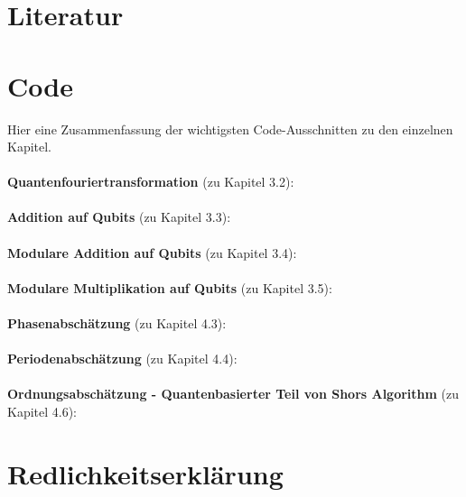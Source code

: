 \section{Literatur}
\printbibliography[heading=none]
\pagebreak
\section{Code}
Hier eine Zusammenfassung der wichtigsten Code-Ausschnitten zu den einzelnen Kapitel.
\paragraph{}

\textbf{Quantenfouriertransformation} (zu Kapitel 3.2):

\paragraph{}

\textbf{Addition auf Qubits} (zu Kapitel 3.3):

\paragraph{}

\textbf{Modulare Addition auf Qubits} (zu Kapitel 3.4):

\paragraph{}

\textbf{Modulare Multiplikation auf Qubits} (zu Kapitel 3.5):

\paragraph{}

\textbf{Phasenabschätzung} (zu Kapitel 4.3):

\paragraph{}

\textbf{Periodenabschätzung} (zu Kapitel 4.4):

\paragraph{}

\textbf{Ordnungsabschätzung - Quantenbasierter Teil von Shors Algorithm} (zu Kapitel 4.6):

\paragraph{}
\section{Redlichkeitserklärung}
